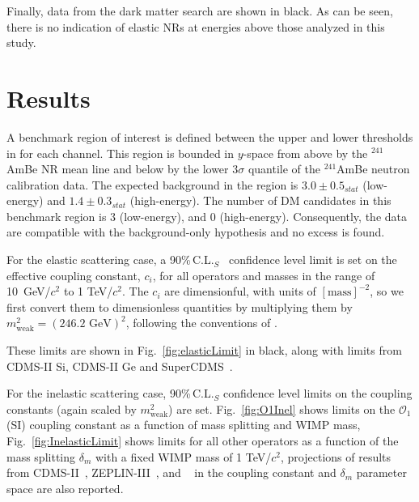 Finally, data from the dark matter search are shown in black. As can be seen, there is no indication of elastic NRs at energies above those analyzed in this study.
 


\section{Results}
\label{sec:Results}

A benchmark region of interest is defined between the upper and lower thresholds in \cSi{} for each channel. This region
is bounded in $y$-space from above by the $^{241}$AmBe NR mean line and below by the lower 3$\sigma$ quantile of the $^{241}$AmBe neutron calibration data. The expected background in the region is $3.0 \pm 0.5_{stat}$ (low-energy) and $1.4 \pm 0.3_{stat}$ (high-energy). The number of DM candidates in this benchmark region is 3 (low-energy), and 0 (high-energy). Consequently, the data are compatible with the background-only hypothesis and no excess is found. 

For the elastic scattering case, a 90\%\,C.L.$_S$~\cite{cls} confidence level limit is set on the effective coupling constant, $c_i$,  for all operators and masses in the range of 10~GeV/$c^2$ to 1 TeV/$c^2$. The $c_i$ are dimensionful, with units of $[\mathrm{mass}]^{-2}$, so we first convert them to dimensionless quantities by multiplying them by $m_\mathrm{weak}^2=(246.2\text{ GeV})^2$, following the conventions of \cite{Anand:MathTools}. 

These limits are shown in Fig.~\ref{fig:elasticLimit} in black, along with limits from CDMS-II Si, CDMS-II Ge and SuperCDMS~\cite{CDMSEFT}.  


For the inelastic scattering case,  90\%\,C.L.$_S$ confidence level limits on the coupling constants 
(again scaled by $m_\mathrm{weak}^2$) are set. Fig.~\ref{fig:O1Inel} shows limits on the $\mathcal{O}_1$ (SI) coupling constant as a function of mass splitting and WIMP mass, Fig.~\ref{fig:InelasticLimit} shows limits for all other operators as a function of the mass splitting $\delta_m$ with a fixed WIMP mass of 1 TeV/$c^2$,  
projections of results from CDMS-II~\cite{CDMS_Inelastic}, ZEPLIN-III~\cite{Zepplin_Inel}, and \Xehund~\cite{XENON_Inelastic_WIMP} in the coupling constant and $\delta_m$ parameter space are also reported.
  

